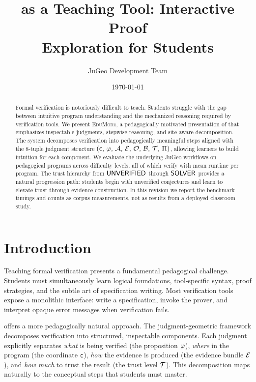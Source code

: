 \documentclass[11pt]{article}
\title{\JuGeo{} as a Teaching Tool: Interactive Proof\\Exploration for Students}
\author{JuGeo Development Team}
\date{\today}
\newcommand{\EduMode}{\textsc{EduMode}}
\begin{document}
\maketitle

\begin{abstract}
Formal verification is notoriously difficult to teach. Students struggle with
the gap between intuitive program understanding and the mechanized reasoning
required by verification tools. We present \EduMode{}, a pedagogically
motivated presentation of \JuGeo{} that emphasizes inspectable judgments,
stepwise reasoning, and site-aware decomposition. The system decomposes
verification into pedagogically meaningful steps aligned with the 8-tuple
judgment structure
$(\mathsf{c},\,\varphi,\,\mathcal{A},\,\mathcal{E},\,\mathcal{O},\,\mathcal{B},\,\mathcal{T},\,\Pi)$,
allowing learners to build intuition for each component. We evaluate the
underlying JuGeo workflows on \ppLXVIprogramCount{} pedagogical programs
across \ppLXVIlevelCount{} difficulty levels, all of which verify with mean
runtime \ppLXVItimeMean{} per program. The trust hierarchy from $\mathsf{UNVERIFIED}$
through
$\mathsf{SOLVER}$ provides a natural progression path: students begin with
unverified conjectures and learn to elevate trust through evidence
construction. In this revision we report the benchmark timings and counts as
corpus measurements, not as results from a deployed classroom study.
\end{abstract}

\section{Introduction}\label{sec:intro}

Teaching formal verification presents a fundamental pedagogical challenge.
Students must simultaneously learn logical foundations, tool-specific syntax,
proof strategies, and the subtle art of specification writing. Most
verification tools expose a monolithic interface: write a specification,
invoke the prover, and interpret opaque error messages when verification fails.

\JuGeo{} offers a more pedagogically natural approach. The judgment-geometric
framework decomposes verification into structured, inspectable components.
Each judgment explicitly separates \emph{what} is being verified (the
proposition $\varphi$), \emph{where} in the program (the coordinate $\mathsf{c}$),
\emph{how} the evidence is produced (the evidence bundle $\mathcal{E}$), and
\emph{how much} to trust the result (the trust level $\mathcal{T}$). This
decomposition maps naturally to the conceptual steps that students must master.
\end{document}
